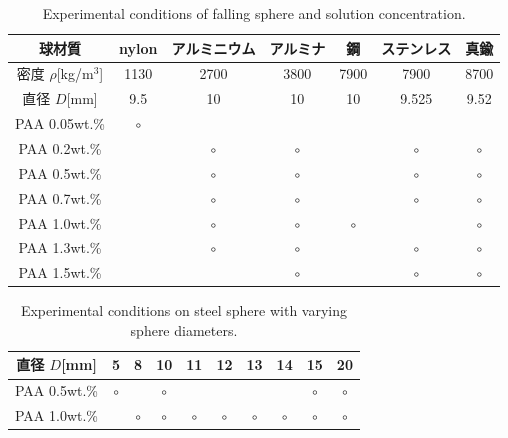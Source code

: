 \begin{table}[h]
    \centering
    \caption{Experimental conditions of falling sphere and solution concentration.}
    \label{table:exp-conditions}
    \begin{tabular}{c|c|c|c|c|c|c}\hline
        球材質                & nylon   & アルミニウム & アルミナ & 鋼      & ステンレス & 真鍮    \\ \hline
        密度 $\rho$[kg/m$^3$] & 1130    & 2700         & 3800     & 7900    & 7900       & 8700    \\ \hline
        直径 $D$[mm]          & 9.5     & 10           & 10       & 10      & 9.525      & 9.52    \\ \hline \hline
        PAA 0.05wt.\%         & $\circ$ &              &          &         &            &         \\ \hline
        PAA 0.2wt.\%          &         & $\circ$      & $\circ$  &         & $\circ$    & $\circ$ \\ \hline
        PAA 0.5wt.\%          &         & $\circ$      & $\circ$  &         & $\circ$    & $\circ$ \\ \hline
        PAA 0.7wt.\%          &         & $\circ$      & $\circ$  &         & $\circ$    & $\circ$ \\ \hline
        PAA 1.0wt.\%          &         & $\circ$      & $\circ$  & $\circ$ &            & $\circ$ \\ \hline
        PAA 1.3wt.\%          &         & $\circ$      & $\circ$  &         & $\circ$    & $\circ$ \\ \hline
        PAA 1.5wt.\%          &         &              & $\circ$  &         & $\circ$    & $\circ$ \\ \hline
    \end{tabular}
\end{table}

\begin{table}[h]
    \centering
    \caption{Experimental conditions on steel sphere with varying sphere diameters.}
    \label{table:exp-conditions-dia}
    \begin{tabular}{c|c|c|c|c|c|c|c|c|c}\hline
        直径 $D$[mm] & 5       & 8       & 10      & 11      & 12      & 13      & 14      & 15      & 20      \\ \hline \hline
        PAA 0.5wt.\% & $\circ$ &         & $\circ$ &         &         &         &         & $\circ$ & $\circ$ \\ \hline
        PAA 1.0wt.\% &         & $\circ$ & $\circ$ & $\circ$ & $\circ$ & $\circ$ & $\circ$ & $\circ$ & $\circ$ \\ \hline
    \end{tabular}
\end{table}

